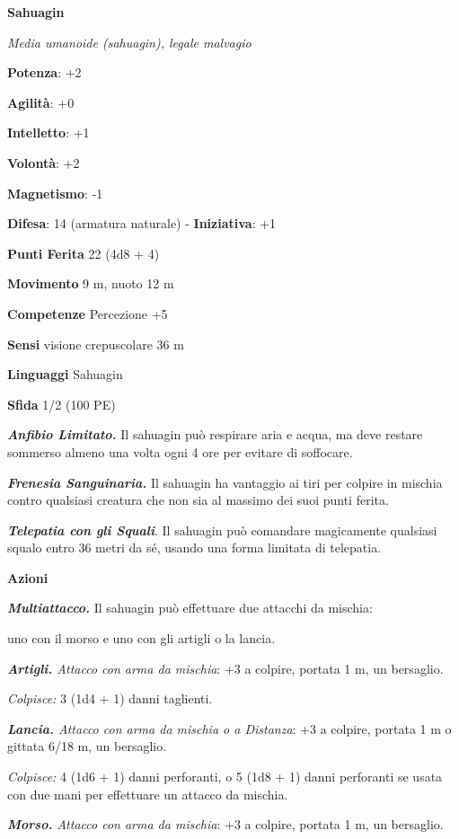 \begin{multicols}{2}
\textbf{Sahuagin}

\emph{Media umanoide (sahuagin), legale malvagio}

\textbf{Potenza}: +2

\textbf{Agilità}: +0

\textbf{Intelletto}: +1

\textbf{Volontà}: +2

\textbf{Magnetismo}: -1

\textbf{Difesa}: 14 (armatura naturale) - \textbf{Iniziativa}: +1

\textbf{Punti Ferita} 22 (4d8 + 4)

\textbf{Movimento} 9 m, nuoto 12 m

\textbf{Competenze} Percezione +5

\textbf{Sensi} visione crepuscolare 36 m

\textbf{Linguaggi} Sahuagin

\textbf{Sfida} 1/2 (100 PE)\smallskip

\emph{\textbf{Anfibio Limitato.}} Il sahuagin può respirare aria e
acqua, ma deve restare sommerso almeno una volta ogni 4 ore per evitare
di soffocare.

\emph{\textbf{Frenesia Sanguinaria.}} Il sahuagin ha vantaggio ai tiri
per colpire in mischia contro qualsiasi creatura che non sia al massimo
dei suoi punti ferita.

\emph{\textbf{Telepatia con gli Squali}}. Il sahuagin può comandare
magicamente qualsiasi squalo entro 36 metri da sé, usando una forma
limitata di telepatia.

\smallskip\textbf{Azioni}

\emph{\textbf{Multiattacco.}} Il sahuagin può effettuare due attacchi da
mischia:

uno con il morso e uno con gli artigli o la lancia.

\emph{\textbf{Artigli.} Attacco con arma da mischia}: +3 a colpire,
portata 1 m, un bersaglio.

\emph{Colpisce:} 3 (1d4 + 1) danni taglienti.

\emph{\textbf{Lancia.} Attacco con arma da mischia o a Distanza}: +3 a
colpire, portata 1 m o gittata 6/18 m, un bersaglio.

\emph{Colpisce:} 4 (1d6 + 1) danni perforanti, o 5 (1d8 + 1) danni
perforanti se usata con due mani per effettuare un attacco da mischia.

\emph{\textbf{Morso.} Attacco con arma da mischia}: +3 a colpire,
portata 1 m, un bersaglio.


\end{multicols}
